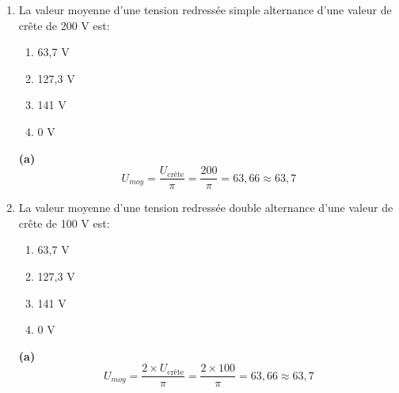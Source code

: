 \documentclass[a4paper]{article}
\begin{document}
\begin{enumerate}
\begin{example}
\begin{center}
    \end{center}
\end{example}





\item La valeur moyenne d'une tension redressée simple alternance d'une valeur de crête de 200 V est:
\begin{enumerate}
    \item 63,7 V
    \item 127,3 V
    \item 141 V
    \item 0 V
\end{enumerate}
\begin{example}
    \textbf{(a)}
    \[ U_{moy} = \frac{U_{\text{crête}}}{\pi} = \frac{200}{\pi} = 63,66 \approx 63,7 \]
\end{example}





\item La valeur moyenne d'une tension redressée double alternance d'une valeur de crête de 100 V est:
\begin{enumerate}
    \item 63,7 V
    \item 127,3 V
    \item 141 V
    \item 0 V
\end{enumerate}
\begin{example}
    \textbf{(a)}
    \[ U_{moy} = \frac{2 \times U_{\text{crête}}}{\pi} = \frac{2 \times 100}{\pi} = 63,66 \approx 63,7 \]
\end{example}






\end{enumerate}
\end{document}
